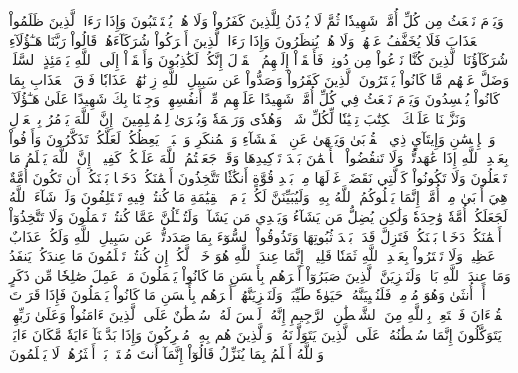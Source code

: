 وَيَوۡمَ نَبۡعَثُ مِن كُلِّ أُمَّةٖ شَهِيدٗا ثُمَّ لَا يُؤۡذَنُ لِلَّذِينَ كَفَرُواْ وَلَا هُمۡ يُسۡتَعۡتَبُونَ
وَإِذَا رَءَا ٱلَّذِينَ ظَلَمُواْ ٱلۡعَذَابَ فَلَا يُخَفَّفُ عَنۡهُمۡ وَلَا هُمۡ يُنظَرُونَ
وَإِذَا رَءَا ٱلَّذِينَ أَشۡرَكُواْ شُرَكَآءَهُمۡ قَالُواْ رَبَّنَا هَـٰٓؤُلَآءِ شُرَكَآؤُنَا ٱلَّذِينَ كُنَّا نَدۡعُواْ مِن دُونِكَۖ فَأَلۡقَوۡاْ إِلَيۡهِمُ ٱلۡقَوۡلَ إِنَّكُمۡ لَكَٰذِبُونَ
وَأَلۡقَوۡاْ إِلَى ٱللَّهِ يَوۡمَئِذٍ ٱلسَّلَمَۖ وَضَلَّ عَنۡهُم مَّا كَانُواْ يَفۡتَرُونَ
ٱلَّذِينَ كَفَرُواْ وَصَدُّواْ عَن سَبِيلِ ٱللَّهِ زِدۡنَٰهُمۡ عَذَابٗا فَوۡقَ ٱلۡعَذَابِ بِمَا كَانُواْ يُفۡسِدُونَ
وَيَوۡمَ نَبۡعَثُ فِي كُلِّ أُمَّةٖ شَهِيدًا عَلَيۡهِم مِّنۡ أَنفُسِهِمۡۖ وَجِئۡنَا بِكَ شَهِيدًا عَلَىٰ هَـٰٓؤُلَآءِۚ وَنَزَّلۡنَا عَلَيۡكَ ٱلۡكِتَٰبَ تِبۡيَٰنٗا لِّكُلِّ شَيۡءٖ وَهُدٗى وَرَحۡمَةٗ وَبُشۡرَىٰ لِلۡمُسۡلِمِينَ
۞إِنَّ ٱللَّهَ يَأۡمُرُ بِٱلۡعَدۡلِ وَٱلۡإِحۡسَٰنِ وَإِيتَآيِٕ ذِي ٱلۡقُرۡبَىٰ وَيَنۡهَىٰ عَنِ ٱلۡفَحۡشَآءِ وَٱلۡمُنكَرِ وَٱلۡبَغۡيِۚ يَعِظُكُمۡ لَعَلَّكُمۡ تَذَكَّرُونَ
وَأَوۡفُواْ بِعَهۡدِ ٱللَّهِ إِذَا عَٰهَدتُّمۡ وَلَا تَنقُضُواْ ٱلۡأَيۡمَٰنَ بَعۡدَ تَوۡكِيدِهَا وَقَدۡ جَعَلۡتُمُ ٱللَّهَ عَلَيۡكُمۡ كَفِيلًاۚ إِنَّ ٱللَّهَ يَعۡلَمُ مَا تَفۡعَلُونَ
وَلَا تَكُونُواْ كَٱلَّتِي نَقَضَتۡ غَزۡلَهَا مِنۢ بَعۡدِ قُوَّةٍ أَنكَٰثٗا تَتَّخِذُونَ أَيۡمَٰنَكُمۡ دَخَلَۢا بَيۡنَكُمۡ أَن تَكُونَ أُمَّةٌ هِيَ أَرۡبَىٰ مِنۡ أُمَّةٍۚ إِنَّمَا يَبۡلُوكُمُ ٱللَّهُ بِهِۦۚ وَلَيُبَيِّنَنَّ لَكُمۡ يَوۡمَ ٱلۡقِيَٰمَةِ مَا كُنتُمۡ فِيهِ تَخۡتَلِفُونَ
وَلَوۡ شَآءَ ٱللَّهُ لَجَعَلَكُمۡ أُمَّةٗ وَٰحِدَةٗ وَلَٰكِن يُضِلُّ مَن يَشَآءُ وَيَهۡدِي مَن يَشَآءُۚ وَلَتُسۡـَٔلُنَّ عَمَّا كُنتُمۡ تَعۡمَلُونَ
وَلَا تَتَّخِذُوٓاْ أَيۡمَٰنَكُمۡ دَخَلَۢا بَيۡنَكُمۡ فَتَزِلَّ قَدَمُۢ بَعۡدَ ثُبُوتِهَا وَتَذُوقُواْ ٱلسُّوٓءَ بِمَا صَدَدتُّمۡ عَن سَبِيلِ ٱللَّهِ وَلَكُمۡ عَذَابٌ عَظِيمٞ
وَلَا تَشۡتَرُواْ بِعَهۡدِ ٱللَّهِ ثَمَنٗا قَلِيلًاۚ إِنَّمَا عِندَ ٱللَّهِ هُوَ خَيۡرٞ لَّكُمۡ إِن كُنتُمۡ تَعۡلَمُونَ
مَا عِندَكُمۡ يَنفَدُ وَمَا عِندَ ٱللَّهِ بَاقٖۗ وَلَنَجۡزِيَنَّ ٱلَّذِينَ صَبَرُوٓاْ أَجۡرَهُم بِأَحۡسَنِ مَا كَانُواْ يَعۡمَلُونَ
مَنۡ عَمِلَ صَٰلِحٗا مِّن ذَكَرٍ أَوۡ أُنثَىٰ وَهُوَ مُؤۡمِنٞ فَلَنُحۡيِيَنَّهُۥ حَيَوٰةٗ طَيِّبَةٗۖ وَلَنَجۡزِيَنَّهُمۡ أَجۡرَهُم بِأَحۡسَنِ مَا كَانُواْ يَعۡمَلُونَ
فَإِذَا قَرَأۡتَ ٱلۡقُرۡءَانَ فَٱسۡتَعِذۡ بِٱللَّهِ مِنَ ٱلشَّيۡطَٰنِ ٱلرَّجِيمِ
إِنَّهُۥ لَيۡسَ لَهُۥ سُلۡطَٰنٌ عَلَى ٱلَّذِينَ ءَامَنُواْ وَعَلَىٰ رَبِّهِمۡ يَتَوَكَّلُونَ
إِنَّمَا سُلۡطَٰنُهُۥ عَلَى ٱلَّذِينَ يَتَوَلَّوۡنَهُۥ وَٱلَّذِينَ هُم بِهِۦ مُشۡرِكُونَ
وَإِذَا بَدَّلۡنَآ ءَايَةٗ مَّكَانَ ءَايَةٖ وَٱللَّهُ أَعۡلَمُ بِمَا يُنَزِّلُ قَالُوٓاْ إِنَّمَآ أَنتَ مُفۡتَرِۭۚ بَلۡ أَكۡثَرُهُمۡ لَا يَعۡلَمُونَ
